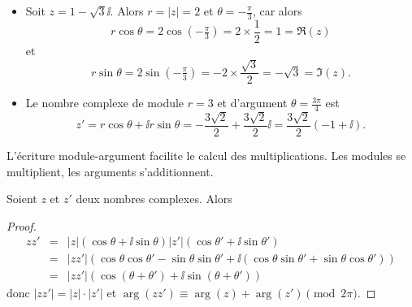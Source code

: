 \documentclass[11pt,class=report,crop=false]{standalone}
\begin{document}
\begin{exemple}
\sauteligne
\begin{itemize}
  \item Soit $z = 1 - \sqrt3\ii$.
  Alors $r=|z| = 2$ et $\theta = -\frac\pi3$, car alors
  $$r\cos\theta = 2\cos(-\tfrac\pi3) = 2\times \frac12 = 1 = \Re(z)$$
  et 
  $$r\sin\theta = 2\sin(-\tfrac\pi3) = -2 \times \frac{\sqrt3}{2} = -\sqrt3 = \Im(z).$$  

\begin{center}
\begin{minipage}{0.45\textwidth}
\end{minipage}
\begin{minipage}{0.45\textwidth}
\end{minipage}  
\end{center}

  \item Le nombre complexe de module $r=3$ et d'argument $\theta=\frac{3\pi}{4}$
  est
  $$z' = r\cos\theta + \ii r\sin\theta = -\frac{3\sqrt2}{2} + \frac{3\sqrt2}{2}\ii
  = \frac{3\sqrt2}{2}(-1+\ii).$$
    
\end{itemize}
\end{exemple}  


L'écriture module-argument facilite le calcul des multiplications.
Les modules se multiplient, les arguments s'additionnent. 
\begin{proposition}
Soient $z$ et $z'$ deux nombres complexes.
Alors
\end{proposition}
 
 
\begin{proof}
   \begin{eqnarray*}
     zz' & = & \left| z \right|  \left( \cos \theta + \ii  \sin \theta \right)
     \left| z' \right|  \left( \cos \theta' + \ii  \sin \theta' \right)\\
     & = & \left| zz' \right|  \left( \cos \theta \cos \theta' - \sin \theta
     \sin \theta' + \ii  \left( \cos \theta \sin \theta' + \sin \theta \cos
     \theta' \right) \right)\\
     & = & \left| zz' \right|  \left( \cos \left( \theta + \theta' \right) + \ii
     \sin \left( \theta + \theta' \right) \right)
   \end{eqnarray*}
   donc $|zz'| = |z| \cdot |z'|$ et $\arg( zz') \equiv \arg (z) + \arg(z') \pmod {2\pi}$.
 \end{proof} 
 
\end{document}
